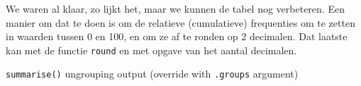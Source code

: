 \documentclass[]{tufte-book}
\newenvironment{Shaded}{}{}
\newcommand{\DataTypeTok}[1]{\textcolor[rgb]{0.56,0.13,0.00}{#1}}
\newcommand{\DecValTok}[1]{\textcolor[rgb]{0.25,0.63,0.44}{#1}}
\newcommand{\KeywordTok}[1]{\textcolor[rgb]{0.00,0.44,0.13}{\textbf{#1}}}
\newcommand{\NormalTok}[1]{#1}
\newcommand{\OperatorTok}[1]{\textcolor[rgb]{0.40,0.40,0.40}{#1}}
\newcommand{\StringTok}[1]{\textcolor[rgb]{0.25,0.44,0.63}{#1}}
\begin{document}
We waren al klaar, zo lijkt het, maar we kunnen de tabel nog verbeteren. Een manier om dat te doen is om de relatieve (cumulatieve) frequenties om te zetten in waarden tussen 0 en 100, en om ze af te ronden op 2 decimalen. Dat laatste kan met de functie \texttt{round} en met opgave van het aantal decimalen.

\begin{Shaded}
\end{Shaded}

\texttt{summarise()} ungrouping output (override with \texttt{.groups} argument)
\end{document}
